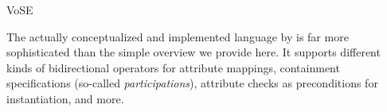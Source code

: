 \begin{copiedFrom}{VoSE}

The actually conceptualized and implemented language by \textcite{gleitze2017a} is far more sophisticated than the simple overview we provide here. 
It supports different kinds of bidirectional operators for attribute mappings, containment specifications (so-called \emph{participations}), attribute checks as preconditions for \commonality instantiation, and more.

\end{copiedFrom} %
